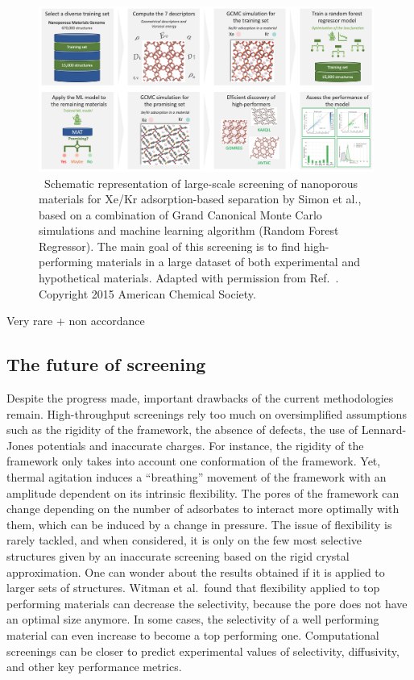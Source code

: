 \documentclass[main.tex]{subfiles}
\begin{document}
\begin{figure}[t]
    \centering
    \includegraphics[width=0.98\textwidth]{figures/1-screening/Simon.jpg}
    \caption{\ Schematic representation of large-scale screening of nanoporous materials for Xe/Kr adsorption-based separation by Simon et al.,\cite{Simon_2015} based on a combination of Grand Canonical Monte Carlo simulations and machine learning algorithm (Random Forest Regressor). The main goal of this screening is to find high-performing materials in a large dataset of both experimental and hypothetical materials. 
    Adapted with permission from Ref.~. Copyright 2015 American Chemical Society.
    }\label{fgr:Simon}
\end{figure}

\cite{Li_2022}

Very rare + non accordance

\subsection{The future of screening}

Despite the progress made, important drawbacks of the current methodologies remain. High-throughput screenings rely too much on oversimplified assumptions such as the rigidity of the framework, the absence of defects, the use of Lennard-Jones potentials and inaccurate charges. For instance, the rigidity of the framework only takes into account one conformation of the framework. Yet, thermal agitation induces a ``breathing'' movement of the framework with an amplitude dependent on its intrinsic flexibility. The pores of the framework can change depending on the number of adsorbates to interact more optimally with them, which can be induced by a change in pressure. The issue of flexibility is rarely tackled, and when considered, it is only on the few most selective structures given by an inaccurate screening based on the rigid crystal approximation. One can wonder about the results obtained if it is applied to larger sets of structures. Witman et al.\ found that flexibility applied to top performing materials can decrease the selectivity, because the pore does not have an optimal size anymore.\cite{Witman_2017} In some cases, the selectivity of a well performing material can even increase to become a top performing one. Computational screenings can be closer to predict experimental values of selectivity, diffusivity, and other key performance metrics.
\end{document}
